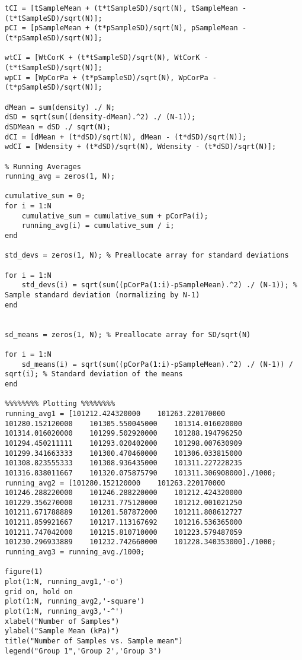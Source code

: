 \documentclass[conf]{new-aiaa}
\begin{document}
\begin{lstlisting}[style=Matlab-editor]
% Calculate Confidence Intervals
tCI = [tSampleMean + (t*tSampleSD)/sqrt(N), tSampleMean - (t*tSampleSD)/sqrt(N)];
pCI = [pSampleMean + (t*pSampleSD)/sqrt(N), pSampleMean - (t*pSampleSD)/sqrt(N)];

wtCI = [WtCorK + (t*tSampleSD)/sqrt(N), WtCorK - (t*tSampleSD)/sqrt(N)];
wpCI = [WpCorPa + (t*pSampleSD)/sqrt(N), WpCorPa - (t*pSampleSD)/sqrt(N)];

dMean = sum(density) ./ N;
dSD = sqrt(sum((density-dMean).^2) ./ (N-1));
dSDMean = dSD ./ sqrt(N);
dCI = [dMean + (t*dSD)/sqrt(N), dMean - (t*dSD)/sqrt(N)];
wdCI = [Wdensity + (t*dSD)/sqrt(N), Wdensity - (t*dSD)/sqrt(N)];

% Running Averages
running_avg = zeros(1, N);

cumulative_sum = 0; 
for i = 1:N
    cumulative_sum = cumulative_sum + pCorPa(i);
    running_avg(i) = cumulative_sum / i;
end

std_devs = zeros(1, N); % Preallocate array for standard deviations

for i = 1:N
    std_devs(i) = sqrt(sum((pCorPa(1:i)-pSampleMean).^2) ./ (N-1)); % Sample standard deviation (normalizing by N-1)
end


sd_means = zeros(1, N); % Preallocate array for SD/sqrt(N)

for i = 1:N
    sd_means(i) = sqrt(sum((pCorPa(1:i)-pSampleMean).^2) ./ (N-1)) / sqrt(i); % Standard deviation of the means
end

%%%%%%%% Plotting %%%%%%%%
running_avg1 = [101212.424320000	101263.220170000	101280.152120000	101305.550045000	101314.016020000	101314.016020000	101299.502920000	101288.194796250	101294.450211111	101293.020402000	101298.007630909	101299.341663333	101300.470460000	101306.033815000	101308.823555333	101308.936435000	101311.227228235	101316.838011667	101320.075875790	101311.306908000]./1000;
running_avg2 = [101280.152120000	101263.220170000	101246.288220000	101246.288220000	101212.424320000	101229.356270000	101231.775120000	101212.001021250	101211.671788889	101201.587872000	101211.808612727	101211.859921667	101217.113167692	101216.536365000	101211.747042000	101215.810710000	101223.579487059	101230.296933889	101232.742660000	101228.340353000]./1000;
running_avg3 = running_avg./1000;

figure(1)
plot(1:N, running_avg1,'-o')
grid on, hold on
plot(1:N, running_avg2,'-square')
plot(1:N, running_avg3,'-^')
xlabel("Number of Samples")
ylabel("Sample Mean (kPa)")
title("Number of Samples vs. Sample mean")
legend("Group 1",'Group 2','Group 3')



\end{lstlisting}
\end{document}
